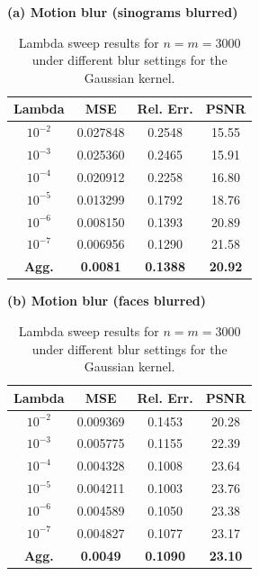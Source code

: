 \documentclass[twoside,11pt]{article}
\begin{document}
{
\renewcommand{\arraystretch}{0.1}
\begin{table}[t]
\centering
\caption{Lambda sweep results for $n=m=3000$ under different blur settings for the Gaussian kernel.}
\label{tab:lambda_sweep_all}

\begin{minipage}[t]{0.48\textwidth}
\centering
\small
\textbf{(a) Motion blur (sinograms blurred)}\\
\renewcommand{\arraystretch}{1.15}
\begin{tabular}{cccc}
\toprule
Lambda & MSE & Rel. Err. & PSNR \\
\midrule
$10^{-2}$ & 0.027848 & 0.2548 & 15.55 \\
$10^{-3}$ & 0.025360 & 0.2465 & 15.91 \\
$10^{-4}$ & 0.020912 & 0.2258 & 16.80 \\
$10^{-5}$ & 0.013299 & 0.1792 & 18.76 \\
$10^{-6}$ & 0.008150 & 0.1393 & 20.89 \\
$10^{-7}$ & 0.006956 & 0.1290 & 21.58 \\
\midrule
\textbf{Agg.} & \textbf{0.0081} & \textbf{0.1388} & \textbf{20.92} \\
\bottomrule
\end{tabular}
\end{minipage}
\hfill
\begin{minipage}[t]{0.48\textwidth}
\centering
\small
\textbf{(b) Motion blur (faces blurred)}\\
\renewcommand{\arraystretch}{1.15}
\begin{tabular}{cccc}
\toprule
Lambda & MSE & Rel. Err. & PSNR \\
\midrule
$10^{-2}$ & 0.009369 & 0.1453 & 20.28 \\
$10^{-3}$ & 0.005775 & 0.1155 & 22.39 \\
$10^{-4}$ & 0.004328 & 0.1008 & 23.64 \\
$10^{-5}$ & 0.004211 & 0.1003 & 23.76 \\
$10^{-6}$ & 0.004589 & 0.1050 & 23.38 \\
$10^{-7}$ & 0.004827 & 0.1077 & 23.17 \\
\midrule
\textbf{Agg.} & \textbf{0.0049} & \textbf{0.1090} & \textbf{23.10} \\
\bottomrule
\end{tabular}
\end{minipage}

\vspace{0.6em}


\end{table}}
\end{document}
